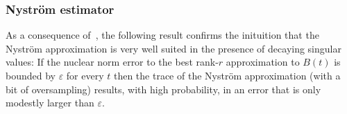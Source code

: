 %
%
%
\subsubsection{Nyström estimator}
\label{subsec:nystrom}

As a consequence of~\cite{kressner-2024-randomized-lowrank}, the following result confirms the inituition that the Nystr\"om approximation is very well suited in the presence of decaying singular values: If the nuclear norm error to the best rank-$r$ approximation to $B(t)$ is bounded by $\varepsilon$ for every $t$ then the trace of the Nystr\"om approximation (with a bit of oversampling) results, with high probability, in an error that is only modestly larger than $\varepsilon$.

